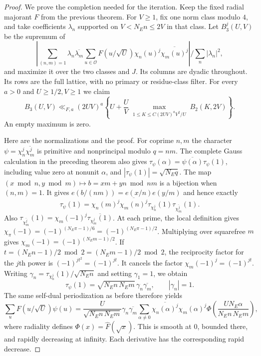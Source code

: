 \documentclass[11pt]{article}
\theoremstyle{remark}\newtheorem{remark}[theorem]{Remark}
\begin{document}
\begin{proof}
We prove the completion needed for the iteration. Keep the fixed radial
majorant $F$ from the previous theorem. For $V\ge1$, fix one norm
class modulo $4$, and take coefficients $\lambda_n$ supported on
$V<N_En\le2V$ in that class. Let $B_3^j(U,V)$ be the supremum of
\[
 \left|\sum_{(n,m)=1}\lambda_n\overline{\lambda_m}
     \sum_{u\in\mathcal O}F(u/\sqrt U)
       \chi_n(u)^j\overline{\chi_m(u)^j}\right|
       \bigg/\sum_n|\lambda_n|^2,                \tag{C0}
\]
and maximize it over the two classes and $J$.
Its columns are dyadic throughout. Its rows are the full lattice,
with no primary or residue-class filter.
For every $a>0$ and $U\ge1/2,V\ge1$ we claim
\[
 B_3(U,V)\ll_{F,a}(2UV)^a
 \left\{U+\frac UV
  \max_{\substack{1\le K\le C(2UV)^aV^2/U}}B_2(K,2V)\right\}.
                                                               \tag{C}
\]
An empty maximum is zero.

Here are the normalizations and the proof. For coprime $n,m$ the
character $\psi=\chi_n^j\overline{\chi_m^j}$ is primitive and
nonprincipal modulo $q=nm$. The complete Gauss calculation in the
preceding theorem also gives
$\tau_\psi(\alpha)=\overline{\psi(\alpha)}\tau_\psi(1)$,
including value zero at nonunit $\alpha$, and
$|\tau_\psi(1)|=\sqrt{N_Eq}$.
The map $(x\bmod n,y\bmod m)\mapsto b=xm+yn\bmod nm$
is a bijection when $(n,m)=1$. It gives
$e(b/(nm))=e(x/n)e(y/m)$ and hence exactly
\[
 \tau_\psi(1)=\chi_n(m)^j\overline{\chi_m(n)^j}
             \tau_{\chi_n^j}(1)\tau_{\overline{\chi_m^j}}(1).
\]
Also
$\tau_{\overline{\chi_m^j}}(1)
=\chi_m(-1)^j\overline{\tau_{\chi_m^j}(1)}$.
At each prime, the local definition gives
$\chi_\pi(-1)=(-1)^{(N_E\pi-1)/6}
=(-1)^{(N_E\pi-1)/2}$.
Multiplying over squarefree $m$ gives
$\chi_m(-1)=(-1)^{(N_Em-1)/2}$.
If $t=(N_En-1)/2\bmod2=(N_Em-1)/2\bmod2$, the reciprocity factor
for the $j$th power is $(-1)^{jt^2}=(-1)^{jt}$.
It cancels the factor $\chi_m(-1)^j=(-1)^{jt}$.
Writing $\gamma_n=\tau_{\chi_n^j}(1)/\sqrt{N_En}$
and setting $\gamma_1=1$, we obtain
\[
 \tau_\psi(1)=\sqrt{N_En\,N_Em}\,
                       \gamma_n\overline{\gamma_m},
 \qquad |\gamma_n|=1.
\]
The same self-dual periodization as before therefore yields
\[
 \sum_u F(u/\sqrt U)\psi(u)
 =\frac{U}{\sqrt{N_En\,N_Em}}\gamma_n\overline{\gamma_m}
   \sum_{\alpha\ne0}\overline{\chi_n(\alpha)^j}\chi_m(\alpha)^j
       \Phi\!\left(\frac{U N_E\alpha}{N_En\,N_Em}\right),          \tag{P}
\]
where radiality defines $\Phi(x)=\widehat F(\sqrt x)$.
This is smooth at $0$, bounded there, and rapidly decreasing at
infinity. Each derivative has the corresponding rapid decrease.


\end{proof}
\end{document}
